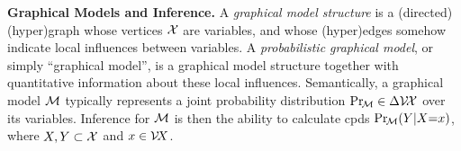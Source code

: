 \textbf{Graphical Models and Inference.}
A \emph{graphical model structure}
is a (directed) (hyper)graph whose vertices $\mathcal X$ are variables, and whose (hyper)edges 
somehow
indicate local influences between variables.
A \emph{probabilistic graphical model},
or simply  ``graphical model'',
is a
graphical model structure
together with quantitative information about these local influences.
%
Semantically,
a graphical model $\cal M$
typically
represents a joint probability distribution $\Pr_{\!\cal M}
 \in \Delta \mathcal V\!\mathcal X$ over its variables.
Inference for $\cal M$ is then the ability to calculate cpds $\Pr_{\!\cal M}(Y|X{=}x)$,
where $X,Y \subset \mathcal X$ and $x \in \mathcal V\! X$. 

